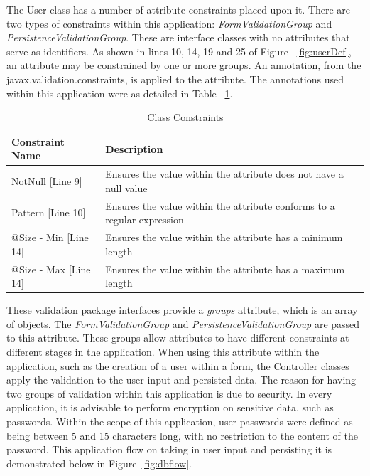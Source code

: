 The User class has a number of attribute constraints placed upon it. There are two types of constraints within this application: \textit{FormValidationGroup} and \textit{PersistenceValidationGroup}. These are interface classes with no attributes that serve as identifiers. As shown in lines 10, 14, 19 and 25 of Figure ~\ref{fig:userDef}, an attribute may be constrained by one or more groups. An annotation, from the javax.validation.constraints, is applied to the attribute. The annotations used within this application were as detailed in Table ~\ref{fig:classConstraints}.

\begin{table}[H]
\caption{Class Constraints}
\begin{center}
    \begin{tabular}{ | l | l | p{5cm} |}
    \hline
    Constraint Name & Description\\ \hline
	NotNull [Line 9] & Ensures the value within the attribute does not have a null value\\ \hline
	Pattern [Line 10] & Ensures the value within the attribute conforms to a regular expression\\ \hline
    @Size - Min [Line 14] & Ensures the value within the attribute has a minimum length\\ \hline
	@Size - Max [Line 14] & Ensures the value within the attribute has a maximum length\\ \hline

    \end{tabular}
\end{center}

\label{fig:classConstraints}
\end{table}

These validation package interfaces provide a \textit{groups} attribute, which is an array of objects. The \textit{FormValidationGroup} and \textit{PersistenceValidationGroup} are passed to this attribute. These groups allow attributes to have different constraints at different stages in the application. When using this attribute within the application, such as the creation of a user within a form, the Controller classes apply the validation to the user input and persisted data. The reason for having two groups of validation within this application is due to security. In every application, it is advisable to perform encryption on sensitive data, such as passwords. Within the scope of this application, user passwords were defined as being between 5 and 15 characters long, with no restriction to the content of the password. This application flow on taking in user input and persisting it is demonstrated below in Figure~\ref{fig:dbflow}.

